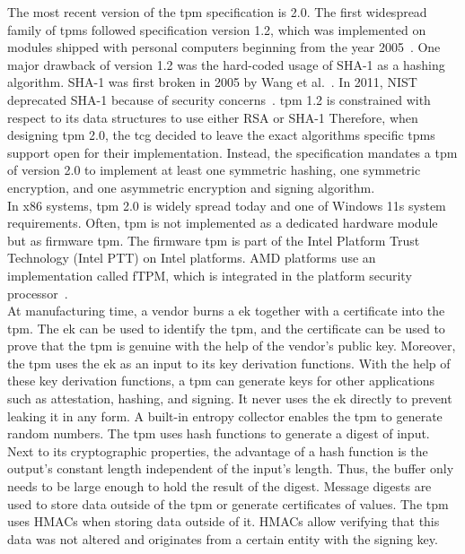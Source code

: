 The most recent version of the \gls{tpm} specification is 2.0. The first
widespread family of \glspl{tpm} followed specification version 1.2, which was
implemented on modules shipped with personal computers beginning from the year
2005~\cite{arthur2015practical}. One major drawback of version 1.2 was the
hard-coded usage of SHA-1 as a hashing algorithm. SHA-1 was first broken in 2005
by Wang et al.~\cite{wang2005collision}. In 2011, NIST deprecated SHA-1 because
of security concerns~\cite{nist-sha1}. \gls{tpm} 1.2 is constrained with respect
to its data structures to use either RSA or SHA-1\cite{tpm_architecture}
Therefore, when designing \gls{tpm} 2.0, the \gls{tcg} decided to leave the
exact algorithms specific \glspl{tpm} support open for their implementation.
Instead, the specification mandates a \gls{tpm} of version 2.0 to implement at
least one symmetric hashing, one symmetric encryption, and one asymmetric
encryption and signing algorithm. \\

In x86 systems, \gls{tpm} 2.0 is widely spread today and one of Windows 11s
system requirements. Often, \gls{tpm} is not implemented as a dedicated hardware
module but as firmware \gls{tpm}. The firmware \gls{tpm} is part of the Intel
Platform Trust Technology (Intel PTT) on Intel platforms. AMD platforms use an
implementation called fTPM, which is integrated in the platform security
processor~\cite{pirker2024brief}. \\

At manufacturing time, a vendor burns a \gls{ek} together with a certificate
into the \gls{tpm}. The \gls{ek} can be used to identify the \gls{tpm}, and the
certificate can be used to prove that the \gls{tpm} is genuine with the help of
the vendor's public key. Moreover, the \gls{tpm} uses the \gls{ek} as an input
to its key derivation functions. With the help of these key derivation
functions, a \gls{tpm} can generate keys for other applications such as
attestation, hashing, and signing. It never uses the \gls{ek} directly to
prevent leaking it in any form. A built-in entropy collector enables the
\gls{tpm} to generate random numbers. The \gls{tpm} uses hash functions to
generate a digest of input. Next to its cryptographic properties, the advantage
of a hash function is the output's constant length independent of the input's
length. Thus, the buffer only needs to be large enough to hold the result of the
digest. Message digests are used to store data outside of the \gls{tpm} or
generate certificates of values. The \gls{tpm} uses HMACs when storing data
outside of it. HMACs allow verifying that this data was not altered and
originates from a certain entity with the signing key.\\

